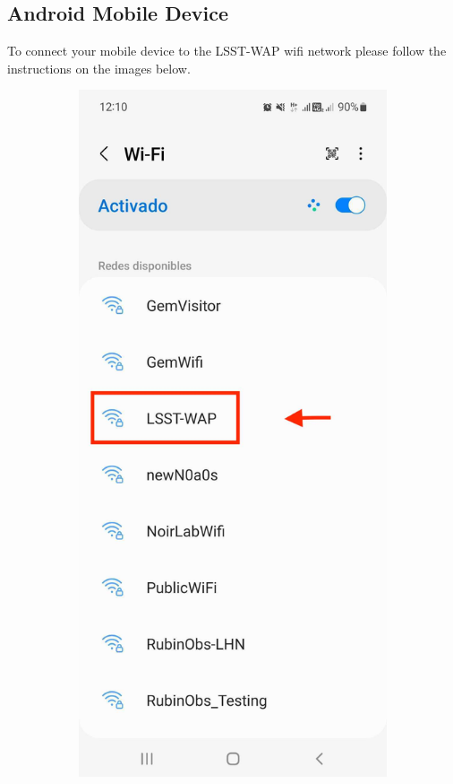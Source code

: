   \subsection{Android Mobile Device}
  To connect your mobile device to the LSST-WAP wifi network please follow the instructions on the images below. 
  \begin{figure}
    \centering
    \begin{subfigure}{0.4\textwidth}
      \includegraphics[width=\textwidth]{Images/Android1.jpg}

\end{subfigure}
\end{figure}
